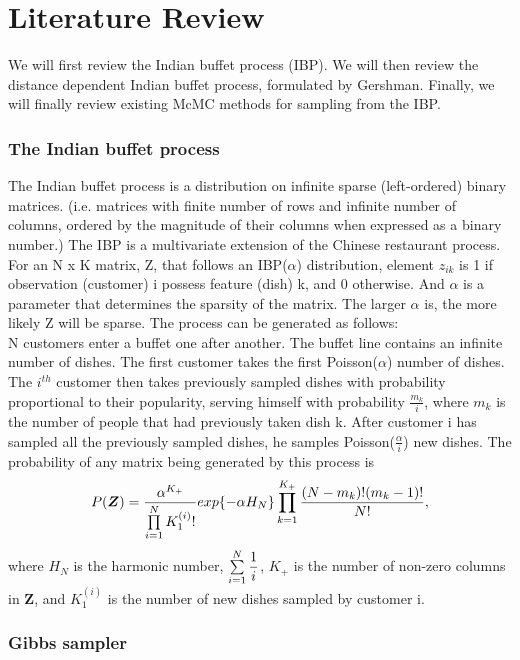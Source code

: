 
\chapter{Literature Review} %
We will first review the Indian buffet process (IBP). We will then review the 
distance dependent Indian buffet process, formulated by Gershman. %
Finally, we will finally review existing McMC methods for sampling from the IBP.

\subsection{The Indian buffet process}
The Indian buffet process is a distribution on infinite sparse (left-ordered)
binary matrices. (i.e. matrices with finite number of rows and infinite number
of columns, ordered by the magnitude of their columns when expressed as a
binary number.) The IBP is a multivariate extension of the Chinese restaurant
process. For an N x K matrix, Z, that follows an IBP($\alpha$) distribution,
element $z_{ik}$ is 1 if observation (customer) i possess feature (dish) k, and
0 otherwise.  And $\alpha$ is a parameter that determines the sparsity of the
matrix. The larger $\alpha$ is, the more likely Z will be sparse. The process
can be generated as follows: \\

\noindent
N customers enter a buffet one after another. The buffet line contains an
infinite number of dishes. The first customer takes the first Poisson($\alpha$)
number of dishes. The $i^{th}$ customer then takes previously sampled dishes
with probability proportional to their popularity, serving himself with
probability $\frac{m_k}{i}$, where $m_k$ is the number of people that had
previously taken dish k. After customer i has sampled all the previously sampled
dishes, he samples Poisson($\frac{\alpha}{i}$) new dishes. The probability of 
any matrix being generated by this process is
\begin{equation}
  P(\bm{Z}) = \frac{\alpha^{K_+}}{\prod\limits_{i=1}^{N} K_1^{(i)}!} 
              exp\{-\alpha H_N\}\prod\limits_{k=1}^{K_+}
              \frac{(N-m_k)!(m_k-1)!}{N!},
\end{equation}
where $H_N$ is the harmonic number, $\sum\limits_{i=1}^{N}\displaystyle\frac{1}{i}$, $K_+$ is the 
number of non-zero columns in $\bm Z$, and $K_1^{(i)}$ is the number of new dishes
sampled by customer i.

\subsection{Gibbs sampler}



